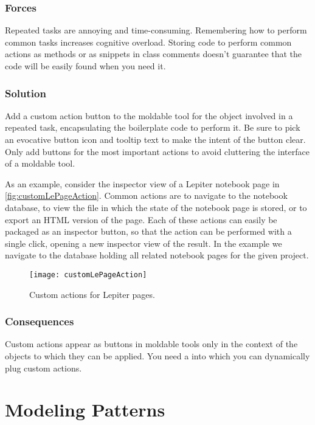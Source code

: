 \documentclass[sigconf]{acmart}
\newcommand{\pattern}[1]{\emph{\nameref{pat:#1}}\xspace}
\begin{document}
\subsubsection*{Forces}
Repeated tasks are annoying and time-consuming.
Remembering how to perform common tasks increases cognitive overload.
Storing code to perform common actions as methods or as snippets in class comments doesn't guarantee that the code will be easily found when you need it.

\subsubsection*{Solution}
Add a custom action button to the moldable tool for the object involved in a repeated task, encapsulating the boilerplate code to perform it.
Be sure to pick an evocative button icon and tooltip text to make the intent of the button clear.
Only add buttons for the most important actions to avoid cluttering the interface of a moldable tool.

As an example, consider the inspector view of a Lepiter notebook page in \autoref{fig:customLePageAction}.
Common actions are to navigate to the notebook database, to view the file in which the state of the notebook page is stored, or to export an HTML version of the page.
Each of these actions can easily be packaged as an inspector button, so that the action can be performed with a single click, opening a new inspector view of the result.
In the example we navigate to the database holding all related notebook pages for the given project.

\begin{figure}[h]
  \texttt{[image: customLePageAction]}
  \caption{Custom actions for Lepiter pages.}
  \label{fig:customLePageAction}
\end{figure}

\subsubsection*{Consequences}
Custom actions appear as buttons in moldable tools only in the context of the objects to which they can be applied.
You need a \pattern{moldableTool} into which you can dynamically plug custom actions.

\section{Modeling Patterns}\label{sec:modeling}
\end{document}
